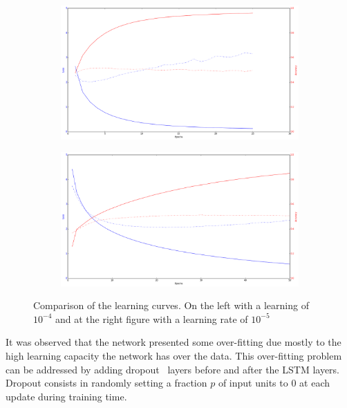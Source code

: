 \begin{figure}[H]
\centering
\begin{subfigure}[b]{.5\textwidth}
  \centering
  \includegraphics[width=1\linewidth]{img/methodology/training_bad}
\end{subfigure}%
\begin{subfigure}[b]{.5\textwidth}
  \centering
  \includegraphics[width=1\linewidth]{img/methodology/training_good}
\end{subfigure}
\caption{Comparison of the learning curves. On the left with a learning of $10^{-4}$ and at the right figure with a learning rate of $10^{-5}$}
\label{fig:training_curves_comparison}
\end{figure}

It was observed that the network presented some over-fitting due mostly to the high learning capacity the network has over the data.
This over-fitting problem can be addressed by adding dropout~\cite{srivastava2014dropout} layers before and after the LSTM layers. Dropout consists in randomly setting a fraction $p$ of input units to 0 at each update during training time.

